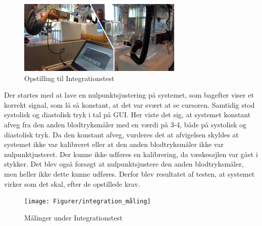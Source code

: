 \begin{figure}[H]
	\centering
	\includegraphics[width=0.7\textwidth]{Figurer/integration_opstilling}
	\caption{Opstilling til Integrationstest}
	\label{fig:Integration_opstilling}
\end{figure}

Der startes med at lave en nulpunktsjustering på systemet, som bagefter viser et korrekt signal, som lå så konstant, at det var svært at se cursoren. Samtidig stod systolisk og diastolisk tryk i tal på GUI. Her viste det sig, at systemet konstant afveg fra den anden blodtryksmåler med en værdi på 3-4, både på systolisk og diastolisk tryk. Da den konstant afveg, vurderes det at afvigelsen skyldes at systemet ikke var kalibreret eller at den anden blodtryksmåler ikke var nulpunktjusteret. Der kunne ikke udføres en kalibrering, da væskesøjlen var gået i stykker. Det blev også forsøgt at nulpunktsjustere den anden blodtryksmåler, men heller ikke dette kunne udføres. Derfor blev resultatet af testen, at systemet virker som det skal, efter de opstillede krav.  

\begin{figure}[H]
	\centering
	\texttt{[image: Figurer/integration\_måling]}
	\caption{Målinger under Integrationstest}
	\label{fig:Integration_resultat}
\end{figure}

